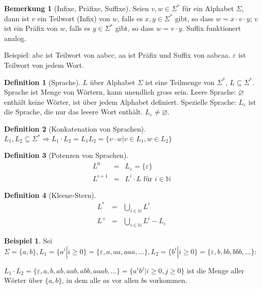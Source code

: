 \documentclass[11pt]{article} %
\theoremstyle{definition}
\newtheorem*{beispiel}{Beispiel}
\newtheorem{definition}{Definition}
\newtheorem*{bemerkung}{Bemerkung}
\begin{document}
\begin{bemerkung}[Infixe, Präfixe, Suffixe]
Seien $v,w \in \Sigma^*$ für ein Alphabet $\Sigma$, dann ist $v$ ein Teilwort (Infix) von $w$, falls es $x,y \in \Sigma^*$ gibt, so dass $w = x\cdot v \cdot y$; $v$ ist ein Präfix von $w$, falls es $y \in \Sigma^*$ gibt, so dass $w = v\cdot y$. Suffix funktionert analog.

Beispiel: abc ist Teilwort von aabcc, aa ist Präfix und Suffix von aabcaa. $\varepsilon$ ist Teilwort von jedem Wort.
\end{bemerkung}

\begin{definition}[Sprache]
$L$ über Alphabet $\Sigma$ ist eine Teilmenge von $\Sigma^*$, $L \subseteq \Sigma^*$. Sprache ist Menge von Wörtern, kann unendlich gross sein. Leere Sprache: $\varnothing$ enthält keine Wörter, ist über jedem Alphabet definiert. Spezielle Sprache: $L_\varepsilon$ ist die Sprache, die nur das leeere Wort enthält. $L_\varepsilon \neq \varnothing$.
\end{definition}

\begin{definition}[Konkatenation von Sprachen] 
$L_1, L_2 \subseteq \Sigma^* \Rightarrow L_1 \cdot L_2 = L_1L_2 = \{ v\cdot w | v\in L_1, w\in L_2 \}$
\end{definition}
\begin{definition}[Potenzen von Sprachen]
\begin{eqnarray*}
L^0 &=& L_\varepsilon = \{\varepsilon\} \\
L^{i+1} &=& L^i\cdot L \textrm{ für } i \in \mathbb{N}
\end{eqnarray*}
\end{definition}

\begin{definition}[Kleene-Stern] 
\begin{eqnarray*}
L^* &=& \bigcup\limits_{i\in \mathbb{N}}^{} L^i \\
L^+ &=& \bigcup\limits_{i\in \mathbb{N}}^{} L^i - L_\varepsilon
\end{eqnarray*}
\end{definition}

\begin{beispiel}
Sei $\Sigma = \{a,b\}, L_1 = \{a^i | i \ge 0\} = \{\varepsilon, a, aa, aaa, \dots\}, L_2 = \{b^i | i \ge 0\} = \{\varepsilon, b, bb, bbb, \dots\}$:

$L_1\cdot L_2 = \{ \varepsilon, a,b,ab,aab,abb,aaab,\dots \} = \{a^ib^j | i \ge 0, j \ge 0 \}$ ist die Menge aller Wörter über $\{a,b\}$, in dem alle $a$s vor allen $b$s vorkommen.
\end{beispiel}
\end{document}
